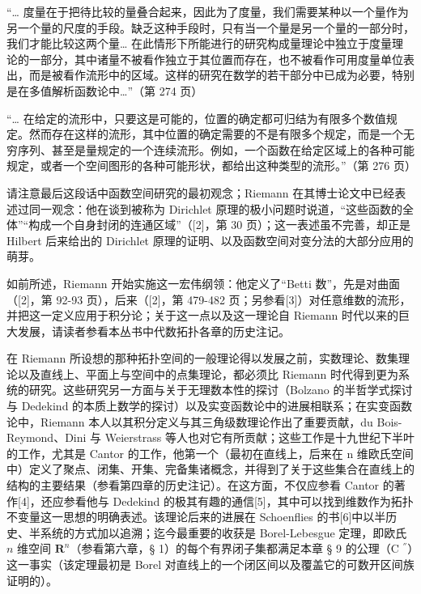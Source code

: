 “\ldots{} 度量在于把待比较的量叠合起来，因此为了度量，我们需要某种以一个量作为另一个量的尺度的手段。缺乏这种手段时，只有当一个量是另一个量的一部分时，我们才能比较这两个量\ldots{} 在此情形下所能进行的研究构成量理论中独立于度量理论的一部分，其中诸量不被看作独立于其位置而存在，也不被看作可用度量单位表出，而是被看作流形中的区域。这样的研究在数学的若干部分中已成为必要，特别是在多值解析函数论中\ldots”（第 274 页）

“\ldots{} 在给定的流形中，只要这是可能的，位置的确定都可归结为有限多个数值规定。然而存在这样的流形，其中位置的确定需要的不是有限多个规定，而是一个无穷序列、甚至是量规定的一个连续流形。例如，一个函数在给定区域上的各种可能规定，或者一个空间图形的各种可能形状，都给出这种类型的流形。”（第 276 页）

请注意最后这段话中函数空间研究的最初观念；Riemann 在其博士论文中已经表述过同一观念：他在谈到被称为 Dirichlet 原理的极小问题时说道，“这些函数的全体”“构成一个自身封闭的连通区域”（{[}2{]}，第 30 页）；这一表述虽不完善，却正是 Hilbert 后来给出的 Dirichlet 原理的证明、以及函数空间对变分法的大部分应用的萌芽。

如前所述，Riemann 开始实施这一宏伟纲领：他定义了“Betti 数”，先是对曲面（{[}2{]}，第 92-93 页），后来（{[}2{]}，第 479-482 页；另参看{[}3{]}）对任意维数的流形，并把这一定义应用于积分论；关于这一点以及这一理论自 Riemann 时代以来的巨大发展，请读者参看本丛书中代数拓扑各章的历史注记。

在 Riemann 所设想的那种拓扑空间的一般理论得以发展之前，实数理论、数集理论以及直线上、平面上与空间中的点集理论，都必须比 Riemann 时代得到更为系统的研究。这些研究另一方面与关于无理数本性的探讨（Bolzano 的半哲学式探讨与 Dedekind 的本质上数学的探讨）以及实变函数论中的进展相联系；在实变函数论中，Riemann 本人以其积分定义与其三角级数理论作出了重要贡献，du Bois-Reymond、Dini 与 Weierstrass 等人也对它有所贡献；这些工作是十九世纪下半叶的工作，尤其是 Cantor 的工作，他第一个（最初在直线上，后来在 n 维欧氏空间中）定义了聚点、闭集、开集、完备集诸概念，并得到了关于这些集合在直线上的结构的主要结果（参看第四章的历史注记）。在这方面，不仅应参看 Cantor 的著作{[}4{]}，还应参看他与 Dedekind 的极其有趣的通信{[}5{]}，其中可以找到维数作为拓扑不变量这一思想的明确表述。该理论后来的进展在 Schoenflies 的书{[}6{]}中以半历史、半系统的方式加以追溯；迄今最重要的收获是 Borel-Lebesgue 定理，即欧氏 \(n\) 维空间 \(\mathbf{R}^n\)（参看第六章，§ 1）的每个有界闭子集都满足本章 § 9 的公理（C \(^{''}\)）这一事实（该定理最初是 Borel 对直线上的一个闭区间以及覆盖它的可数开区间族证明的）。

